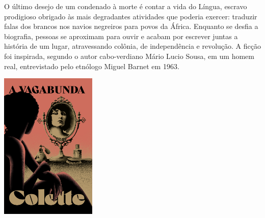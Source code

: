 \hspace*{-7cm}\hrulefill\hspace*{-7cm}

\medskip

\noindent{}O último desejo de um condenado à morte é contar a vida do Língua, escravo prodigioso obrigado às mais degradantes atividades que poderia exercer: traduzir falas dos brancos nos navios negreiros para povos da África. Enquanto se desfia a biografia, pessoas se aproximam para ouvir e acabam por escrever juntas a história de um lugar, atravessando colônia, de independência e revolução. A ficção foi inspirada, segundo o autor cabo-verdiano Mário Lucio Sousa, em um homem real, entrevistado pelo etnólogo Miguel Barnet em 1963.

\vfill

\hspace*{-.4cm}\begin{minipage}[c]{1\linewidth}
\small{
{}}
\end{minipage}

\pagebreak

\hspace{.5cm}

\begin{center}
\hspace*{-2.5cm}
\hspace*{2cm}\includegraphics[width=45.8mm]{./imgs/vagabond.jpg}
\end{center}

